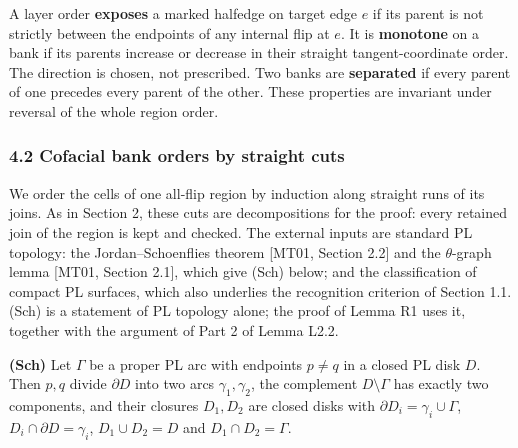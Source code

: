 \documentclass[
  11pt,
]{article}
\begin{document}
A layer order \textbf{exposes} a marked halfedge on target edge \(e\) if
its parent is not strictly between the endpoints of any internal flip at
\(e\). It is \textbf{monotone} on a bank if its parents increase or
decrease in their straight tangent-coordinate order. The direction is
chosen, not prescribed. Two banks are \textbf{separated} if every parent
of one precedes every parent of the other. These properties are
invariant under reversal of the whole region order.

\subsubsection{4.2 Cofacial bank orders by straight
cuts}\label{cofacial-bank-orders-by-straight-cuts}

We order the cells of one all-flip region by induction along straight
runs of its joins. As in Section 2, these cuts are decompositions for
the proof: every retained join of the region is kept and checked. The
external inputs are standard PL topology: the Jordan--Schoenflies
theorem {[}MT01, Section 2.2{]} and the \(\theta\)-graph lemma {[}MT01,
Section 2.1{]}, which give (Sch) below; and the classification of
compact PL surfaces, which also underlies the recognition criterion of
Section 1.1. (Sch) is a statement of PL topology alone; the proof of
Lemma R1 uses it, together with the argument of Part 2 of Lemma L2.2.

\textbf{(Sch)} Let \(\Gamma\) be a proper PL arc with endpoints
\(p\ne q\) in a closed PL disk \(D\). Then \(p,q\) divide \(\partial D\)
into two arcs \(\gamma_1,\gamma_2\), the complement
\(D\setminus \Gamma\) has exactly two components, and their closures
\(D_1,D_2\) are closed disks with \(\partial D_i=\gamma_i\cup \Gamma\),
\(D_i\cap\partial D=\gamma_i\), \(D_1\cup D_2=D\) and
\(D_1\cap D_2=\Gamma\).
\end{document}
